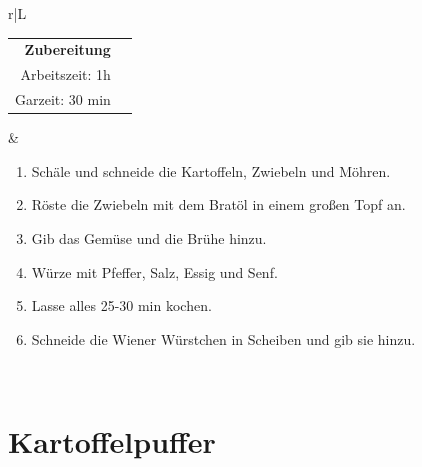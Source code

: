 \documentclass[a4paper, 12pt]{scrbook} 								%
\numberwithin{equation}{section} 									%
\begin{document}
			\newpage
			\begin{tabularx}{\textwidth}{r|L}						
									
			\begin{tabular}[t]{rr}
				\textbf{Zubereitung}	\\
				Arbeitszeit: 1h	\\
				Garzeit: 30 min	\\
			\end{tabular}			&	\begin{enumerate}[nosep]
											\item Schäle und schneide die Kartoffeln, Zwiebeln und Möhren.
											\item Röste die Zwiebeln mit dem Bratöl in einem großen Topf an.
											\item Gib das Gemüse und die Brühe hinzu.
											\item Würze mit Pfeffer, Salz, Essig und Senf.
											\item Lasse alles 25-30 min kochen.
											\item Schneide die Wiener Würstchen in Scheiben und gib sie hinzu.
										\end{enumerate}	\\
		\end{tabularx}
		\newpage


		\section{Kartoffelpuffer}	\label{kartoffelpuffer}
\end{document}
